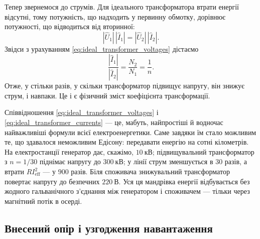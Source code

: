 Тепер звернемося до струмів. Для ідеального трансформатора
втрати енергії відсутні, тому потужність, що надходить у
первинну обмотку, дорівнює потужності, що відводиться від
вторинної:
\begin{equation}\label{eq:ideal_transformer_power}
	|\hat{U}_1|\,|\hat{I}_1| = |\hat{U}_2|\,|\hat{I}_2|.
\end{equation}
Звідси з урахуванням \eqref{eq:ideal_transformer_voltages}
дістаємо
\begin{equation}\label{eq:ideal_transformer_currents}
	\frac{|\hat{I}_1|}{|\hat{I}_2|} = \frac{N_2}{N_1} = \frac{1}{n}.
\end{equation}
Отже, у стільки разів, у скільки трансформатор підвищує
напругу, він знижує струм, і навпаки. Це і є фізичний зміст
коефіцієнта трансформації.

\begin{Attention}
	Співвідношення \eqref{eq:ideal_transformer_voltages} і
	\eqref{eq:ideal_transformer_currents} --- це, мабуть,
	найпростіші й водночас найважливіші формули всієї
	електроенергетики. Саме завдяки їм стало можливим те, що
	здавалося неможливим Едісону: передавати енергію на сотні
	кілометрів. На електростанції генератор дає, скажімо,
	$10\ \text{кВ}$; підвищувальний трансформатор з $n=1/30$
	піднімає напругу до $300\ \text{кВ}$; у лінії струм
	зменшується в $30$ разів, а втрати $RI_{\text{eff}}^2$ ---
	у $900$ разів. Біля споживача знижувальний трансформатор
	повертає напругу до безпечних $220\ \text{В}$. Уся ця
	мандрівка енергії відбувається без жодного гальванічного
	з'єднання між генератором і споживачем --- тільки через
	магнітний потік в осерді.
\end{Attention}

\subsection*{Внесений опір і узгодження навантаження}

